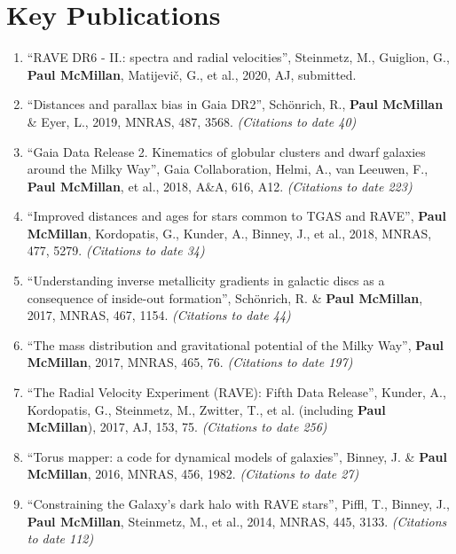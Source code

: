 \documentclass{resume}
\begin{document}
\section*{Key Publications}

\begin{enumerate}
\item ``RAVE DR6 - II.: spectra and radial velocities'', Steinmetz, M., Guiglion, G., \textbf{Paul McMillan}, Matijevi\v c, G., et al., 2020, AJ, submitted.
\item ``Distances and parallax bias in Gaia DR2'', Sch\"onrich, R., \textbf{Paul McMillan} \& Eyer, L., 2019, MNRAS, 487, 3568. \textit{(Citations to date 40)}

\item ``Gaia Data Release 2. Kinematics of globular clusters and dwarf galaxies around the Milky Way'', Gaia Collaboration, Helmi, A., van Leeuwen, F., \textbf{Paul McMillan}, et al., 2018, A\&A, 616, A12. \textit{(Citations to date 223)}

\item ``Improved distances and ages for stars common to TGAS and RAVE'', \textbf{Paul McMillan}, Kordopatis, G., Kunder, A., Binney, J., et al., 2018, MNRAS, 477, 5279. \textit{(Citations to date 34)}

\item ``Understanding inverse metallicity gradients in galactic discs as a consequence of inside-out formation'', Sch\"onrich, R. \& \textbf{Paul McMillan}, 2017, MNRAS, 467, 1154. \textit{(Citations to date 44)}

\item ``The mass distribution and gravitational potential of the Milky Way'', \textbf{Paul McMillan}, 2017, MNRAS, 465, 76. \textit{(Citations to date 197)}

\item ``The Radial Velocity Experiment (RAVE): Fifth Data Release'', Kunder, A., Kordopatis, G., Steinmetz, M., Zwitter, T., et al. (including \textbf{Paul McMillan}), 2017, AJ, 153, 75. \textit{(Citations to date 256)}

\item ``Torus mapper: a code for dynamical models of galaxies'', Binney, J. \& \textbf{Paul McMillan}, 2016, MNRAS, 456, 1982. \textit{(Citations to date 27)}

\item ``Constraining the Galaxy's dark halo with RAVE stars'', Piffl, T., Binney, J., \textbf{Paul McMillan}, Steinmetz, M., et al., 2014, MNRAS, 445, 3133. \textit{(Citations to date 112)}


\end{enumerate}
\end{document}
